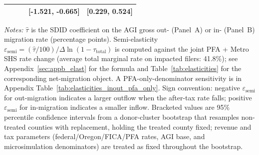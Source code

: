 \begin{table}[htbp]
\begin{threeparttable}
\begin{tabular}{lll cc}
 & & & [-1.521, -0.665] & [0.229, 0.524] \\
\bottomrule
\end{tabular}
\begin{tablenotes}
\small
\item \textit{Notes:} 
$\hat{\tau}$ is the SDID coefficient on the AGI gross out- (Panel~A) or in- (Panel~B) migration rate (percentage points). 
Semi-elasticity $\varepsilon_{\text{semi}} = (\hat{\tau}/100)/\Delta\ln(1-\tau_\text{total})$ is computed against the joint PFA + Metro SHS rate change (average total marginal rate on impacted filers: 41.8\%); see Appendix~\ref{sec:appb_elast} for the formula and Table~\ref{tab:elasticities} for the corresponding net-migration object. 
A PFA-only-denominator sensitivity is in Appendix Table~\ref{tab:elasticities_inout_pfa_only}. 
Sign convention: negative $\varepsilon_{\text{semi}}$ for out-migration indicates a larger outflow when the after-tax rate falls; positive $\varepsilon_{\text{semi}}$ for in-migration indicates a smaller inflow. 
Bracketed values are 95\% percentile confidence intervals from a 
donor-cluster bootstrap that resamples non-treated counties with replacement, 
holding the treated county fixed; revenue and tax parameters 
(federal/Oregon/FICA/PFA rates, AGI base, and microsimulation denominators) 
are treated as fixed throughout the bootstrap.
\end{tablenotes}
\end{threeparttable}
\end{table}
